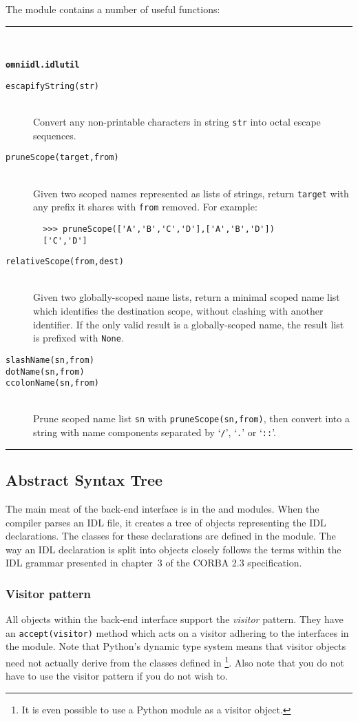 \documentclass[11pt,twoside,a4paper]{article}
\newcommand{\func}[1]{\texttt{#1}}
\newcommand{\var}[1]{\texttt{#1}}
\newcommand{\dfunc}[1]{\item[\func{#1}]\mbox{}\\}
\newcommand{\cfunc}[1]{\item[\func{#1}]}
\newenvironment{funcdesc}[1]%
  {\vspace{\baselineskip}%
   \noindent\begin{minipage}{\textwidth}%
   \noindent\rule{\textwidth}{1.5pt}\\%
   \centerline{\textbf{\texttt{#1}}}%
   \vspace{-.5\baselineskip}%
   \begin{description}}
  {\vspace{-\baselineskip}\end{description}%
   \noindent\rule{\textwidth}{1.5pt}\end{minipage}}
\begin{document}
The  module contains a number of useful
functions:


\begin{funcdesc}{omniidl.idlutil}

\dfunc{escapifyString(str)}
  Convert any non-printable characters in string \var{str} into octal
  escape sequences.

\dfunc{pruneScope(target,from)}
  Given two scoped names represented as lists of strings, return
  \var{target} with any prefix it shares with \var{from} removed. For
  example:
\begin{verbatim}
  >>> pruneScope(['A','B','C','D'],['A','B','D'])
  ['C','D']
\end{verbatim}

\dfunc{relativeScope(from,dest)}
  Given two globally-scoped name lists, return a minimal scoped name
  list which identifies the destination scope, without clashing with
  another identifier. If the only valid result is a globally-scoped
  name, the result list is prefixed with \var{None}.

\cfunc{slashName(sn,from)}
\cfunc{dotName(sn,from)}
\dfunc{ccolonName(sn,from)}
  Prune scoped name list \var{sn} with \func{pruneScope(sn,from)},
  then convert into a string with name components separated by
  `\texttt{/}', `\texttt{.}'  or `\texttt{::}'.

\end{funcdesc}


\subsection{Abstract Syntax Tree}
\label{sec:ast}

The main meat of the back-end interface is in the
 and  modules. When the
compiler parses an IDL file, it creates a tree of objects representing
the IDL declarations. The classes for these declarations are defined
in the  module. The way an IDL declaration is split into
objects closely follows the terms within the IDL grammar presented in
chapter~3 of the CORBA 2.3 specification.


\subsubsection{Visitor pattern}

All objects within the back-end interface support the \emph{visitor}
pattern. They have an \func{accept(visitor)} method which acts on a
visitor adhering to the interfaces in the 
module. Note that Python's dynamic type system means that visitor
objects need not actually derive from the classes defined in
\footnote{It is even possible to use a Python module
as a visitor object.}. Also note that you do not have to use the
visitor pattern if you do not wish to.
\end{document}
